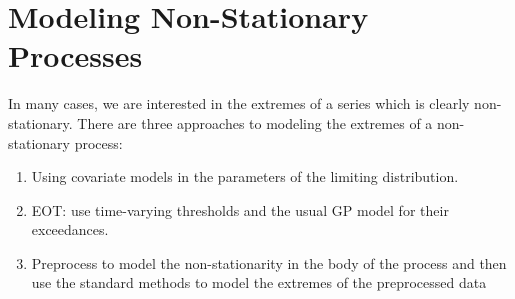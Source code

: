 \documentclass{article}
\theoremstyle{definition}
\theoremstyle{definition}
\begin{document}
\section{Modeling Non-Stationary Processes}
In many cases, we are interested in the extremes of
a series which is clearly non-stationary. There are three approaches to modeling the extremes of a non-stationary process:
\begin{enumerate}
    \item Using covariate models in the parameters of the
limiting distribution.
    \item EOT: use time-varying thresholds and the usual
GP model for their exceedances.
    \item Preprocess to model the non-stationarity in the
body of the process and then use the standard
methods to model the extremes of the preprocessed data
\end{enumerate}
\end{document}
